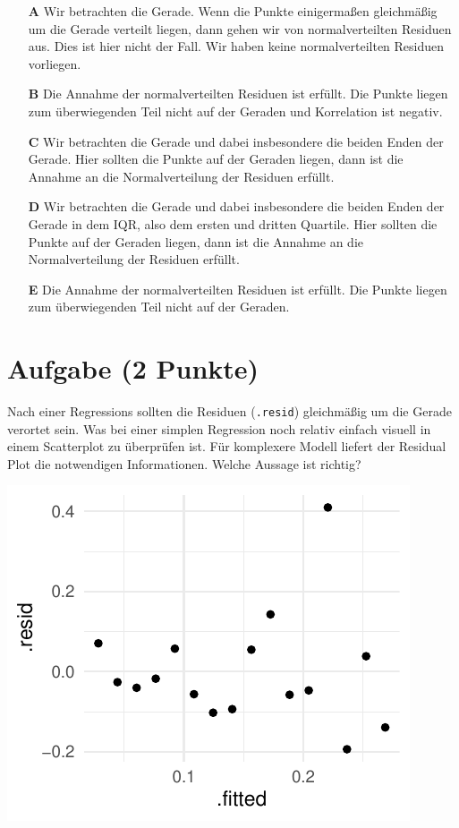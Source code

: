 \documentclass[a4paper, 9pt]{scrartcl}\usepackage[]{graphicx}\usepackage[]{xcolor}
\makeatletter
\def\maxwidth{ %
  \ifdim\Gin@nat@width>\linewidth
    \linewidth
  \else
    \Gin@nat@width
  \fi
}
\makeatother
\begin{document}
\begin{enumerate}
\item [\textbf{A} \msquare] Wir betrachten die Gerade. Wenn die Punkte einigermaßen gleichmäßig um die Gerade verteilt liegen, dann gehen wir von normalverteilten Residuen aus. Dies ist hier nicht der Fall. Wir haben keine normalverteilten Residuen vorliegen.
\item [\textbf{B} \msquare] Die Annahme der normalverteilten Residuen ist erfüllt. Die Punkte liegen zum überwiegenden Teil nicht auf der Geraden und Korrelation ist negativ.
\item [\textbf{C} \msquare] Wir betrachten die Gerade und dabei insbesondere die beiden Enden der Gerade. Hier sollten die Punkte auf der Geraden liegen, dann ist die Annahme an die Normalverteilung der Residuen erfüllt.
\item [\textbf{D} \msquare] Wir betrachten die Gerade und dabei insbesondere die beiden Enden der Gerade in dem IQR, also dem ersten und dritten Quartile. Hier sollten die Punkte auf der Geraden liegen, dann ist die Annahme an die Normalverteilung der Residuen erfüllt.
\item [\textbf{E} \msquare] Die Annahme der normalverteilten Residuen ist erfüllt. Die Punkte liegen zum überwiegenden Teil nicht auf der Geraden.
\end{enumerate}

\section{Aufgabe \hfill (2 Punkte)}



Nach einer Regressions sollten die Residuen (\texttt{.resid}) gleichmäßig um die Gerade verortet sein. Was bei einer simplen Regression noch relativ einfach visuell in einem Scatterplot zu überprüfen ist. Für komplexere Modell liefert der Residual Plot die notwendigen Informationen. Welche Aussage ist richtig?



{\centering \includegraphics[width=\maxwidth]{img/mc-regression-06-a-1} 

}
\end{document}

